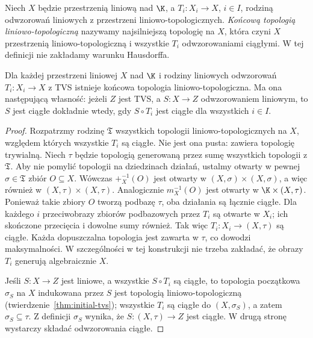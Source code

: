 \begin{definicja}
Niech $X$ będzie przestrzenią liniową nad $\K$, a
$T_i:X_i\to X$, $i\in I$, rodziną odwzorowań
liniowych z przestrzeni liniowo-topologicznych.
\emph{Końcową topologią liniowo-topologiczną}
nazywamy najsilniejszą topologię na $X$, która czyni $X$
przestrzenią liniowo-topologiczną i wszystkie $T_i$
odwzorowaniami ciągłymi. W tej definicji nie zakładamy
warunku Hausdorffa.
\end{definicja}

\begin{twierdzenie}
\label{thm:final-tvs}
Dla każdej przestrzeni liniowej $X$ nad $\K$ i rodziny
liniowych odwzorowań $T_i:X_i\to X$ z TVS istnieje
końcowa topologia liniowo-topologiczna. Ma ona następującą
własność: jeżeli $Z$ jest TVS, a $S:X\to Z$ odwzorowaniem
liniowym, to $S$ jest ciągłe dokładnie wtedy, gdy
$S\circ T_i$ jest ciągłe dla wszystkich $i\in I$.
\end{twierdzenie}
\begin{proof}
Rozpatrzmy rodzinę $\mathfrak T$ wszystkich topologii
liniowo-topologicznych na $X$, względem których wszystkie
$T_i$ są ciągłe. Nie jest ona pusta: zawiera topologię
trywialną. Niech $\tau$ będzie topologią generowaną
przez sumę wszystkich topologii z $\mathfrak T$.
Aby nie pomylić topologii na dziedzinach działań,
ustalmy otwarty w pewnej $\sigma\in\mathfrak T$ zbiór
$O\subseteq X$. Wówczas
$+_X^{-1}(O)$ jest otwarty w $(X,\sigma)\times(X,\sigma)$,
a więc również w $(X,\tau)\times(X,\tau)$.
Analogicznie $m_X^{-1}(O)$ jest otwarty w
$\K\times(X,\tau)$. Ponieważ takie zbiory $O$
tworzą podbazę $\tau$, oba działania są łącznie ciągłe.
Dla każdego $i$ przeciwobrazy zbiorów podbazowych przez
$T_i$ są otwarte w $X_i$; ich skończone przecięcia
i dowolne sumy również. Tak więc $T_i:X_i\to(X,\tau)$
są ciągłe. Każda dopuszczalna topologia jest zawarta
w $\tau$, co dowodzi maksymalności. W szczególności
w tej konstrukcji nie trzeba zakładać, że obrazy $T_i$
generują algebraicznie $X$.

Jeśli $S:X\to Z$ jest liniowe, a wszystkie $S\circ T_i$
są ciągłe, to topologia początkowa $\sigma_S$ na $X$
indukowana przez $S$ jest topologią liniowo-topologiczną
(twierdzenie~\ref{thm:initial-tvs}); wszystkie $T_i$
są ciągłe do $(X,\sigma_S)$, a zatem $\sigma_S\subseteq\tau$.
Z definicji $\sigma_S$ wynika, że $S:(X,\tau)\to Z$
jest ciągłe. W drugą stronę wystarczy składać odwzorowania
ciągłe.
\end{proof}

